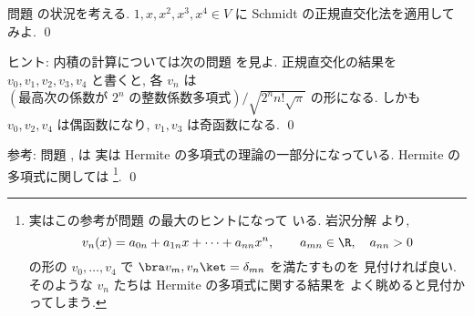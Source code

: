 \documentclass[12pt,twoside]{jarticle}
\begin{document}

\begin{question}[10点]
\label{q:Hermite-polyn-2}
  問題  の状況を考える. 
  $1,x,x^2,x^3,x^4\in V$ に Schmidt の正規直交化法を適用してみよ.
  \qed
\end{question}

\noindent
ヒント: 内積の計算については次の問題  を見よ.
正規直交化の結果を $v_0,v_1,v_2,v_3,v_4$ と書くと, 
各 $v_n$ は $(\text{最高次の係数が $2^n$ の整数係数多項式})\big/
\sqrt{2^nn!\sqrt{\pi}}$ の形になる.
しかも $v_0,v_2,v_4$ は偶函数になり, $v_1,v_3$ は奇函数になる.
\qed

\medskip
\noindent
参考: 問題 ,  は
実は Hermite の多項式の理論の一部分になっている.  
Hermite の多項式に関しては%
\footnote{実はこの参考が問題  の最大のヒントになって
  いる. 岩沢分解  より,
  \begin{equation*}
    v_n(x)=a_{0n}+a_{1n}x+\cdots+a_{nn}x^n,
    \qquad a_{mn}\in\R, \quad a_{nn}>0
  \end{equation*}
  の形の $v_0,\dots,v_4$ で $\bra v_m,v_n\ket = \delta_{mn}$ を満たすものを
  見付ければ良い. そのような $v_n$ たちは Hermite の多項式に関する結果を
  よく眺めると見付かってしまう.}.
\qed
\end{document}
